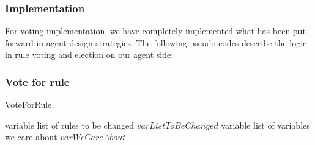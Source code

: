 \subsubsection{Implementation} \label{subsubsec:Team6_Voting:Implementation}
For voting implementation, we have completely implemented what has been put forward in agent design strategies. The following pseudo-codes describe the logic in rule voting and election on our agent side:
\subsubsection{Vote for rule}
\begin{algorithm}
    \caption{VoteForRule} 
        variable list of rules to be changed $varListToBeChanged$\;
        variable list of variables we care about  $varWeCareAbout$\;
    \end{algorithm}

